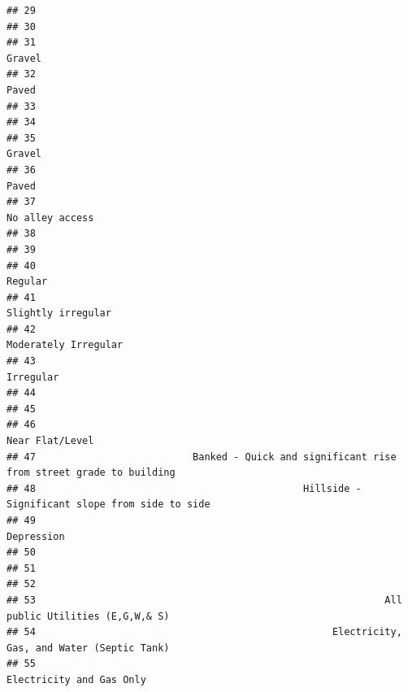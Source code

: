 \documentclass[
]{article}
\begin{document}
\begin{verbatim}
## 29                                                                                            
## 30                                                                                            
## 31                                                                                      Gravel
## 32                                                                                       Paved
## 33                                                                                            
## 34                                                                                            
## 35                                                                                      Gravel
## 36                                                                                       Paved
## 37                                                                             No alley access
## 38                                                                                            
## 39                                                                                            
## 40                                                                                     Regular
## 41                                                                          Slightly irregular
## 42                                                                        Moderately Irregular
## 43                                                                                   Irregular
## 44                                                                                            
## 45                                                                                            
## 46                                                                             Near Flat/Level
## 47                           Banked - Quick and significant rise from street grade to building
## 48                                              Hillside - Significant slope from side to side
## 49                                                                                  Depression
## 50                                                                                            
## 51                                                                                            
## 52                                                                                            
## 53                                                            All public Utilities (E,G,W,& S)
## 54                                                   Electricity, Gas, and Water (Septic Tank)
## 55                                                                    Electricity and Gas Only

\end{verbatim}
\end{document}
